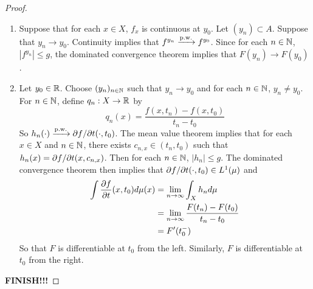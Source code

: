\documentclass{book}
\begin{document}
	\begin{proof}\
	\begin{enumerate}
	\item Suppose that for each $x \in X$, $f_x$ is continuous at $y_0$. Let $(y_n) \subset A$. Suppose that $y_n \rightarrow y_0$. Continuity implies that $f^{y_n} \xrightarrow{\text{p.w.}} f^{y_0}$. Since for each $n \in \mathbb{N}$, $|f^{y_n}| \leq g$, the dominated convergence theorem implies that $F(y_n) \rightarrow F(y_0)$.
	\item Let $y_0 \in \mathbb{R}$. Choose $(y_n)_{n \in \mathbb{N}}$ such that $ y_n \rightarrow y_0$ and for each $n \in \mathbb{N}$, $y_n \neq y_0$. For $n \in \mathbb{N}$, define $q_n:X \rightarrow \mathbb{R}$ by 
	$$q_n(x) = \frac{f(x,t_n) - f(x, t_0)}{t_n - t_0}$$ So $h_n(\cdot) \xrightarrow{\text{p.w.}} \partial f / \partial t (\cdot, t_0)$. The mean value theorem implies that for each $x \in X$ and $n \in \mathbb{N}$, there exists $c_{n,x} \in (t_n,t_0)$ such that $h_n(x) = \partial f / \partial t (x, c_{n,x})$. Then for each $n \in \mathbb{N}$, $|h_n| \leq g$. The dominated convergence theorem then implies that $\partial f / \partial t (\cdot, t_0) \in L^1(\mu)$ and 
	\begin{align*}
	\int \frac{\partial f }{\partial t} (x, t_0) d\mu(x) 
	&=  \lim \limits_{n \rightarrow \infty} \int_X h_n d\mu  \\
	&= \lim \limits_{n \rightarrow \infty} \frac{F(t_n) - F(t_0)}{t_n - t_0} \\
	&= F'(t_0^-) 	
	\end{align*}
	So that $F$ is differentiable at $t_0$ from the left. Similarly, $F$ is differentiable at $t_0$ from the right. 
	\end{enumerate}
	\textbf{FINISH!!!}
	\end{proof}
\end{document}
